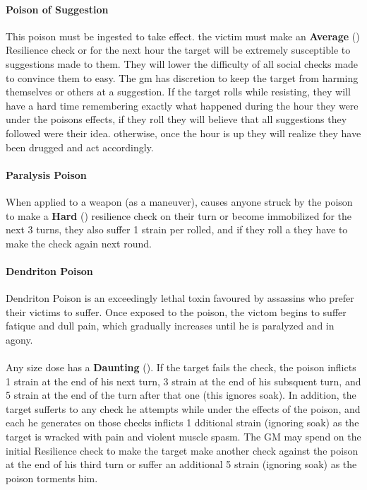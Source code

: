 \begin{multicols}{2}
\paragraph{Poison of Suggestion} \label{poison:suggestion}
This poison must be ingested to take effect. the victim must make an
\textbf{Average} (\difficulty\difficulty) Resilience check or for the next hour
the target will be extremely susceptible to suggestions made to them.
They will lower the difficulty of all social checks made to convince
them to easy. The gm has discretion to keep the target from harming
themselves or others at a suggestion. If the target rolls \threat\threat\threat
while resisting, they will have a hard time remembering exactly what
happened during the hour they were under the poisons effects, if they
roll \despair they will believe that all suggestions they followed
were their idea. otherwise, once the hour is up they will realize
they have been drugged and act accordingly.

\paragraph{Paralysis Poison} \label{poison:paralysis}
When applied to a weapon (as a maneuver), causes anyone
struck by the poison to make a \textbf{Hard} (\difficulty\difficulty\difficulty)
resilience check on their turn or become immobilized for
the next 3 turns, they also suffer 1 strain per \threat
rolled, and if they roll a \despair they have to make the
check again next round.

\paragraph{Dendriton Poison} \label{poison:dendriton}
Dendriton Poison is an exceedingly lethal toxin favoured by assassins who
prefer their victims to suffer. Once exposed to the poison, the victom begins
to suffer fatique and dull pain, which gradually increases until he is
paralyzed and in agony.\\
\\
Any size dose has a \textbf{Daunting} (\difficulty\difficulty\difficulty\difficulty).
If the target fails the check, the poison inflicts 1 strain at the end of his
next turn, 3 strain at the end of his subsquent turn, and 5 strain at the end
of the turn after that one (this ignores soak). In addition, the target sufferts
\setback to any check he attempts while under the effects of the poison, and
each \threat he generates on those checks inflicts 1 dditional strain (ignoring
soak) as the target is wracked with pain and violent muscle spasm. The GM may
spend \despair on the initial Resilience check to make the target make another
check against the poison at the end of his third turn or suffer an additional
5 strain (ignoring soak) as the poison torments him.


\end{multicols}

